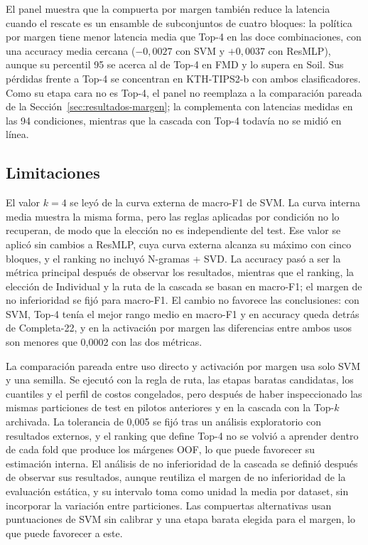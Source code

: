 \documentclass[a4paper,fleqn]{cas-sc}
\begin{document}
El panel muestra que la compuerta por margen también reduce la latencia cuando el rescate es un ensamble de subconjuntos de cuatro bloques: la política por margen tiene menor latencia media que Top-4 en las doce combinaciones, con una accuracy media cercana ($-0{,}0027$ con SVM y $+0{,}0037$ con ResMLP), aunque su percentil 95 se acerca al de Top-4 en FMD y lo supera en Soil. Sus pérdidas frente a Top-4 se concentran en KTH-TIPS2-b con ambos clasificadores. Como su etapa cara no es Top-4, el panel no reemplaza a la comparación pareada de la Sección~\ref{sec:resultados-margen}; la complementa con latencias medidas en las 94 condiciones, mientras que la cascada con Top-4 todavía no se midió en línea.

\subsection{Limitaciones}

El valor $k=4$ se leyó de la curva externa de macro-F1 de SVM. La curva interna media muestra la misma forma, pero las reglas aplicadas por condición no lo recuperan, de modo que la elección no es independiente del test. Ese valor se aplicó sin cambios a ResMLP, cuya curva externa alcanza su máximo con cinco bloques, y el ranking no incluyó N-gramas + SVD. La accuracy pasó a ser la métrica principal después de observar los resultados, mientras que el ranking, la elección de Individual y la ruta de la cascada se basan en macro-F1; el margen de no inferioridad se fijó para macro-F1. El cambio no favorece las conclusiones: con SVM, Top-4 tenía el mejor rango medio en macro-F1 y en accuracy queda detrás de Completa-22, y en la activación por margen las diferencias entre ambos usos son menores que 0,0002 con las dos métricas.

La comparación pareada entre uso directo y activación por margen usa solo SVM y una semilla. Se ejecutó con la regla de ruta, las etapas baratas candidatas, los cuantiles y el perfil de costos congelados, pero después de haber inspeccionado las mismas particiones de test en pilotos anteriores y en la cascada con la Top-$k$ archivada. La tolerancia de 0,005 se fijó tras un análisis exploratorio con resultados externos, y el ranking que define Top-4 no se volvió a aprender dentro de cada fold que produce los márgenes OOF, lo que puede favorecer su estimación interna. El análisis de no inferioridad de la cascada se definió después de observar sus resultados, aunque reutiliza el margen de no inferioridad de la evaluación estática, y su intervalo toma como unidad la media por dataset, sin incorporar la variación entre particiones. Las compuertas alternativas usan puntuaciones de SVM sin calibrar y una etapa barata elegida para el margen, lo que puede favorecer a este.
\end{document}
